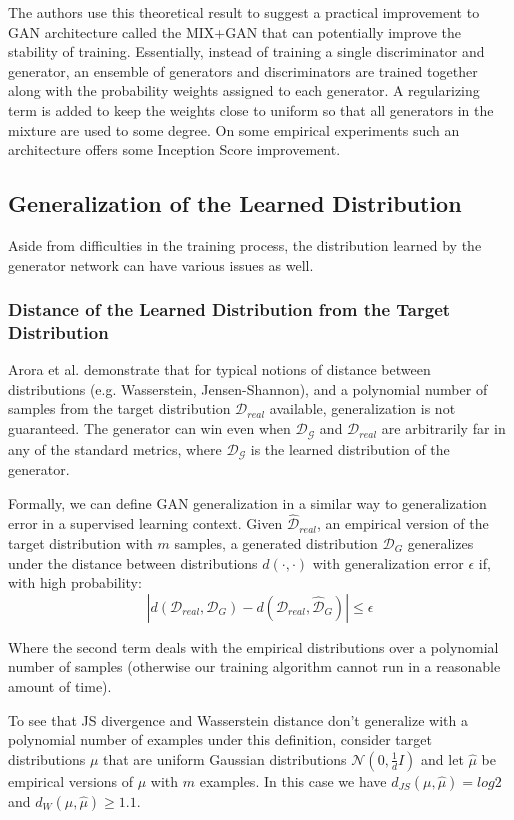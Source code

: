 The authors use this theoretical result to suggest a practical improvement to GAN architecture called the MIX+GAN that can potentially improve the stability of training. Essentially, instead of training a single discriminator and generator, an ensemble of generators and discriminators are trained together along with the probability weights assigned to each generator. A regularizing term is added to keep the weights close to uniform so that all generators in the mixture are used to some degree. On some empirical experiments such an architecture offers some Inception Score improvement.

\subsection{Generalization of the Learned Distribution}
Aside from difficulties in the training process, the distribution learned by the generator network can have various issues as well.

\subsubsection{Distance of the Learned Distribution from the Target Distribution}

Arora et al. \cite{arora2017eq} demonstrate that for typical notions of distance between distributions (e.g. Wasserstein, Jensen-Shannon), and a polynomial number of samples from the target distribution $\mathcal{D}_{real}$ available, generalization is not guaranteed. The generator can win even when $\mathcal{D_G}$ and $\mathcal{D}_{real}$ are arbitrarily far in any of the standard metrics, where $\mathcal{D_G}$ is the learned distribution of the generator.

Formally, we can define GAN generalization in a similar way to generalization error in a supervised learning context. Given $\hat{\mathcal{D}}_{real}$, an empirical version of the target distribution with $m$ samples, a generated distribution $\mathcal{D}_G$ generalizes under the distance between distributions $d(\cdot, \cdot)$ with generalization error $\epsilon$ if, with high probability:
$$
|d(\mathcal{D}_{real}, \mathcal{D}_G) - d(\hat{\mathcal{D}}_{real}, \hat{\mathcal{D}}_G)| \leq \epsilon
$$

Where the second term deals with the empirical distributions over a polynomial number of samples (otherwise our training algorithm cannot run in a reasonable amount of time).

To see that JS divergence and Wasserstein distance don't generalize with a polynomial number of examples under this definition, consider target distributions $\mu$ that are uniform Gaussian distributions $\mathcal{N}(0, \frac{1}{d}I)$ and let $\hat{\mu}$ be empirical versions of $\mu$ with $m$ examples. In this case we have $d_{JS}(\mu, \hat{\mu}) = log2$ and $d_{W}(\mu, \hat{\mu}) \geq 1.1$.

